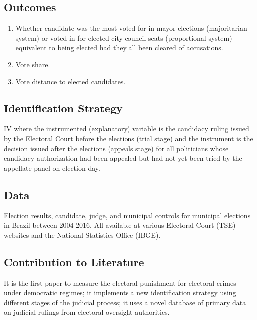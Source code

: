 \documentclass[]{article}
\begin{document}
\hypertarget{outcomes}{%
\subsection{Outcomes}\label{outcomes}}

\begin{enumerate}
\item
  Whether candidate was the most voted for in mayor elections
  (majoritarian system) or voted in for elected city council seats
  (proportional system) -- equivalent to being elected had they all been
  cleared of accusations.
\item
  Vote share.
\item
  Vote distance to elected candidates.
\end{enumerate}

\hypertarget{identification-strategy}{%
\subsection{Identification Strategy}\label{identification-strategy}}

IV where the instrumented (explanatory) variable is the candidacy ruling
issued by the Electoral Court before the elections (trial stage) and the
instrument is the decision issued after the elections (appeals stage)
for all politicians whose candidacy authorization had been appealed but
had not yet been tried by the appellate panel on election day.

\hypertarget{data}{%
\subsection{Data}\label{data}}

Election results, candidate, judge, and municipal controls for municipal
elections in Brazil between 2004-2016. All available at various
Electoral Court (TSE) websites and the National Statistics Office
(IBGE).

\hypertarget{contribution-to-literature}{%
\subsection{Contribution to
Literature}\label{contribution-to-literature}}

It is the first paper to measure the electoral punishment for electoral
crimes under democratic regimes; it implements a new identification
strategy using different stages of the judicial process; it uses a novel
database of primary data on judicial rulings from electoral oversight
authorities.
\end{document}

